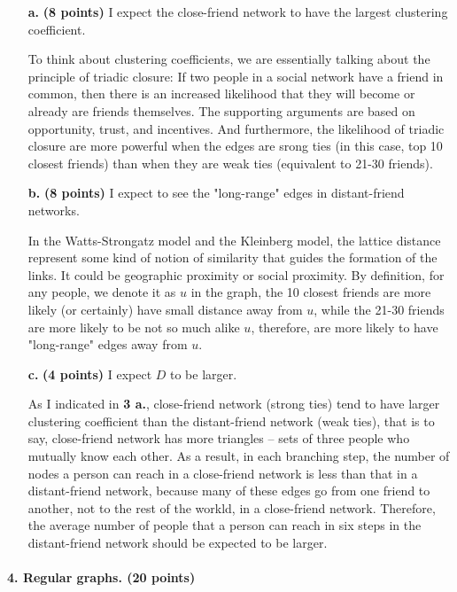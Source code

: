 \documentclass[11pt]{article} %
\begin{document}
\begin{enumerate}

\item[\textbf{a.}]  \textbf{(8 points)} 
I expect the close-friend network to have the largest clustering coefficient. 

To think about clustering coefficients, we are essentially talking about the principle of triadic closure: If two people in a social network have a friend in common, then there is an increased likelihood that they will become or already are friends themselves. The supporting arguments are based on opportunity, trust, and incentives. And furthermore, the likelihood of triadic closure are more powerful when the edges are srong ties (in this case, top 10 closest friends) than when they are weak ties (equivalent to 21-30 friends).

\item[\textbf{b.}]  \textbf{(8 points)}  
I expect to see the "long-range" edges in distant-friend networks. 

In the Watts-Strongatz model and the Kleinberg model, the lattice distance represent some kind of notion of similarity that guides the formation of the links. It could be geographic proximity or social proximity. By definition, for any people, we denote it as $u$ in the graph, the 10 closest friends are more likely (or certainly) have small distance away from $u$, while the 21-30 friends are more likely to be not so much alike $u$, therefore, are more likely to have "long-range" edges away from $u$.


\item[\textbf{c.}]  \textbf{(4 points)}
I expect $D$ to be larger. 

As I indicated in \textbf{3 a.}, close-friend network (strong ties) tend to have larger clustering coefficient than the distant-friend network (weak ties), that is to say, close-friend network has more triangles -- sets of three people who mutually know each other. As a result, in each branching step, the number of nodes a person can reach in a close-friend network is less than that in a distant-friend network, because many of these edges go from one friend to another, not to the rest of the workld, in a close-friend network. Therefore, the average number of people that a person can reach in six steps in the distant-friend network should be expected to be larger.

\end{enumerate}
 

\paragraph{4. Regular graphs. (20 points)}  
\end{document}

